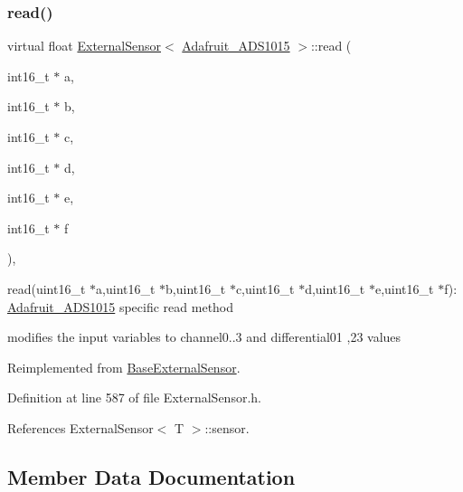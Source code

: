 \subsubsection{\texorpdfstring{read()}{read()}}
{\footnotesize\ttfamily virtual float \hyperlink{class_external_sensor}{External\+Sensor}$<$ \hyperlink{class_adafruit___a_d_s1015}{Adafruit\+\_\+\+A\+D\+S1015} $>$\+::read (\begin{DoxyParamCaption}\item[{int16\+\_\+t $\ast$}]{a,  }\item[{int16\+\_\+t $\ast$}]{b,  }\item[{int16\+\_\+t $\ast$}]{c,  }\item[{int16\+\_\+t $\ast$}]{d,  }\item[{int16\+\_\+t $\ast$}]{e,  }\item[{int16\+\_\+t $\ast$}]{f }\end{DoxyParamCaption})\hspace{0.3cm}{\ttfamily [inline]}, {\ttfamily [virtual]}}

read(uint16\+\_\+t $\ast$a,uint16\+\_\+t $\ast$b,uint16\+\_\+t $\ast$c,uint16\+\_\+t $\ast$d,uint16\+\_\+t $\ast$e,uint16\+\_\+t $\ast$f)\+: \hyperlink{class_adafruit___a_d_s1015}{Adafruit\+\_\+\+A\+D\+S1015} specific read method

modifies the input variables to channel0..3 and differential01 ,23 values 

Reimplemented from \hyperlink{class_base_external_sensor_a1867ba10561be26f2f5ec29421e6fb21}{Base\+External\+Sensor}.



Definition at line 587 of file External\+Sensor.\+h.



References External\+Sensor$<$ T $>$\+::sensor.



\subsection{Member Data Documentation}
\mbox{\label{class_external_sensor_3_01_adafruit___a_d_s1015_01_4_a9492450437bd0fe277dcb851177aa8fe}} 
